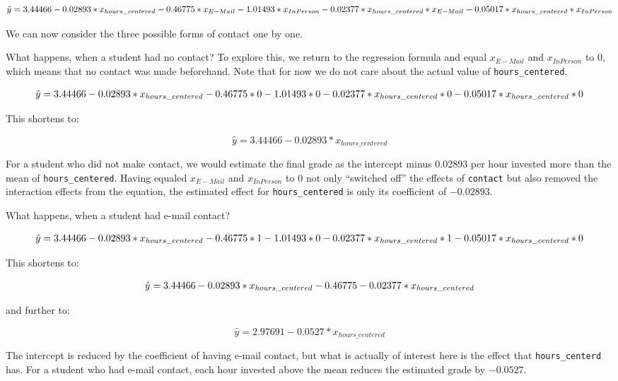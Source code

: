 \documentclass[
]{book}
\begin{document}
\[\hat{y} = 3.44466 -0.02893 * x_{hours\_centered} -\\
0.46775 * x_{E-Mail} -1.01493 * x_{In Person} -\\
0.02377 * x_{hours\_centered} * x_{E-Mail} -\\
0.05017 * x_{hours\_centered} * x_{In Person}\]

We can now consider the three possible forms of contact one by one.

What happens, when a student had no contact? To explore this, we return to the regression formula and equal \(x_{E-Mail}\) and \(x_{In Person}\) to \(0\), which means that no contact was made beforehand. Note that for now we do not care about the actual value of \texttt{hours\_centered}.

\[\hat{y} = 3.44466 -0.02893 *x_{hours\_centered} -\\
0.46775 * 0 -1.01493 * 0 -\\
0.02377 * x_{hours\_centered} * 0 -\\
0.05017 * x_{hours\_centered} * 0\]

This shortens to:

\[\hat{y} = 3.44466 -0.02893 *x_{hours\_centered}\]

For a student who did not make contact, we would estimate the final grade as the intercept minus \(0.02893\) per hour invested more than the mean of \texttt{hours\_centered}. Having equaled \(x_{E-Mail}\) and \(x_{In Person}\) to \(0\) not only ``switched off'' the effects of \texttt{contact} but also removed the interaction effects from the equation, the estimated effect for \texttt{hours\_centered} is only its coefficient of \(-0.02893\).

What happens, when a student had e-mail contact?

\[\hat{y} = 3.44466 -0.02893 * x_{hours\_centered} -\\
0.46775 * 1 -1.01493 * 0 -\\
0.02377 * x_{hours\_centered} * 1 -\\
0.05017 * x_{hours\_centered} * 0\]

This shortens to:

\[\hat{y} = 3.44466 -0.02893 *x_{hours\_centered} -\\
0.46775 -\\
0.02377 * x_{hours\_centered}\]

and further to:

\[\hat{y} = 2.97691 -0.0527 *x_{hours\_centered}\]

The intercept is reduced by the coefficient of having e-mail contact, but what is actually of interest here is the effect that \texttt{hours\_centerd} has. For a student who had e-mail contact, each hour invested above the mean reduces the estimated grade by \(-0.0527\).
\end{document}
